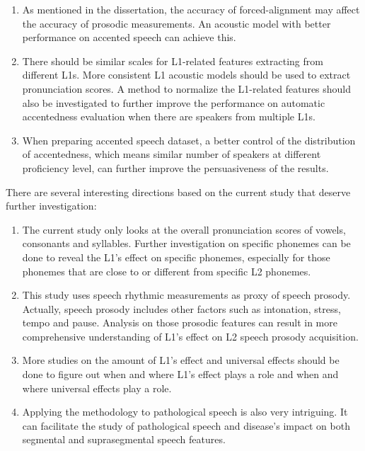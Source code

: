 \begin{enumerate}
\item As mentioned in the dissertation, the accuracy of forced-alignment may affect the accuracy of prosodic measurements. An acoustic model with better performance on accented speech can achieve this.
\item There should be similar scales for L1-related features extracting from different L1s. More consistent L1 acoustic models should be used to extract pronunciation scores. A method to normalize the L1-related features should also be investigated to further improve the performance on automatic accentedness evaluation when there are speakers from multiple L1s.
\item When preparing accented speech dataset, a better control of the distribution of accentedness, which means similar number of speakers at different proficiency level, can further improve the persuasiveness of the results.
\end{enumerate}
There are several interesting directions based on the current study that deserve further investigation:

\begin{enumerate}
\item The current study only looks at the overall pronunciation scores of vowels, consonants and syllables. Further investigation on specific phonemes can be done to reveal the L1's effect on specific phonemes, especially for those phonemes that are close to or different from specific L2 phonemes.
\item This study uses speech rhythmic measurements as proxy of speech prosody. Actually, speech prosody includes other factors such as intonation, stress, tempo and pause. Analysis on those prosodic features can result in more comprehensive understanding of L1's effect on L2 speech prosody acquisition.
\item More studies on the amount of L1's effect and universal effects should be done to figure out when and where L1's effect plays a role and when and where universal effects play a role.
\item Applying the methodology to pathological speech is also very intriguing. It can facilitate the study of pathological speech and disease's impact on both segmental and suprasegmental speech features.
\end{enumerate}
